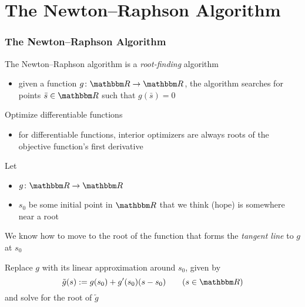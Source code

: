 \section{The Newton--Raphson Algorithm}

\begin{frame}\frametitle{The Newton--Raphson Algorithm}

    \vspace{2em}
    The Newton--Raphson algorithm is a \emph{root-finding} algorithm
    \begin{itemize}
        \item given a function $g \colon \RR \to \RR$, the algorithm searches for
        points $\bar s \in \RR$ such that $g(\bar s) = 0$
    \end{itemize}
    
    \vspace{.7em}
    
    Optimize differentiable functions
    
    \begin{itemize}
        \item for differentiable
    functions, interior optimizers are always roots of the 
    objective function's first derivative
    \end{itemize}
    
    
\end{frame}

\begin{frame}

    \vspace{2em}
    Let 
    \begin{itemize}
        \item $g \colon \RR \to \RR$
        \item $s_0$ be some initial point in $\RR$ that we think (hope) is somewhere near a root
    \end{itemize} 
    
    \vspace{.7em}
    We know how to move to the root of the
    function that forms the \emph{tangent line} to $g$ at $s_0$
    
    Replace $g$ with its linear approximation around $s_0$, given by
    \begin{equation*}
        \tilde g(s) := g(s_0) + g'(s_0)(s - s_0)   
        \qquad (s \in \RR)
    \end{equation*}
    and solve for the root of $\tilde g$
    
\end{frame}

